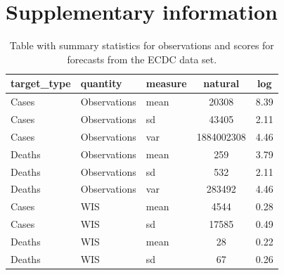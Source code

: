 \documentclass{article}
\begin{document}








\newpage

\appendix
\section{Supplementary information}

\begin{table}[h!]
    \centering
    
    \begin{tabular}{lllcc}
    \toprule
    target\_type & quantity & measure & natural & log\\
    \midrule
    Cases & Observations & mean & 20308 & 8.39\\
    Cases & Observations & sd & 43405 & 2.11\\
    Cases & Observations & var & 1884002308 & 4.46\\
    \addlinespace
    Deaths & Observations & mean & 259 & 3.79\\
    Deaths & Observations & sd & 532 & 2.11\\
    Deaths & Observations & var & 283492 & 4.46\\
    \addlinespace
    \hline
    \addlinespace
    Cases & WIS & mean & 4544 & 0.28\\
    Cases & WIS & sd & 17585 & 0.49\\
    \addlinespace
    Deaths & WIS & mean & 28 & 0.22\\
    Deaths & WIS & sd & 67 & 0.26\\
    \bottomrule
    \end{tabular}
    \caption{Table with summary statistics for observations and scores for forecasts from the ECDC data set.}
    \label{tab:HUB-summary}
\end{table}
\end{document}
